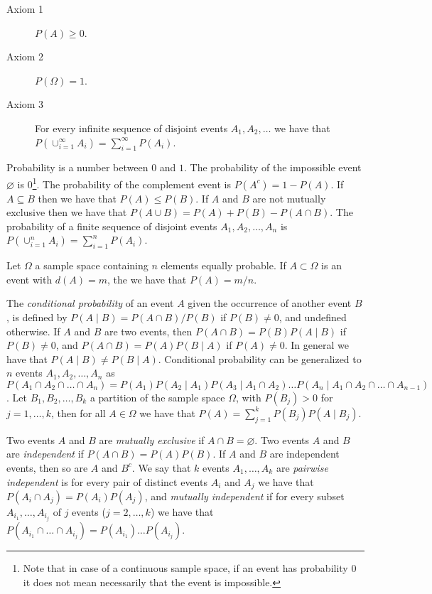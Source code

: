 \medskip

\begin{description}
\item [Axiom 1] $P(A) \geq 0$.
\item [Axiom 2] $P(\Omega) = 1$.
\item [Axiom 3] For every infinite sequence of disjoint events $A_1, A_2, \ldots$ we have that $P(\cup_{i=1}^\infty A_i) = \sum_{i=1}^\infty P(A_i)$.
\end{description}

\medskip

Probability is a number between $0$ and $1$. The probability of the impossible event $\varnothing$ is $0$\footnote{Note that in case of a continuous sample space, if an event has probability $0$ it does not mean necessarily that the event is impossible.}. The probability of the complement event is $P(A^c) = 1 - P(A)$. If $A \subseteq B$ then we have that $P(A) \leq P(B)$. If $A$ and $B$ are not mutually exclusive then we have that $P(A \cup B) = P(A) + P(B) - P(A \cap B)$. The probability of a finite sequence of disjoint events $A_1, A_2, \ldots, A_n$ is $P(\cup_{i=1}^n A_i) = \sum_{i=1}^n P(A_i)$.

\begin{example}
Let $\Omega$ a sample space containing $n$ elements equally probable. If $A \subset \Omega$ is an event with $d(A) = m$, the we have that $P(A) = m/n$.
\end{example}

The \emph{conditional probability} of an event $A$ given the occurrence of another event $B$, is defined by $P(A \mid B) = P(A \cap B) / P(B)$ if $P(B) \neq 0$, and undefined otherwise. If $A$ and $B$ are two events, then $P(A \cap B) = P(B) P(A \mid B)$ if $P(B) \neq 0$, and $P(A \cap B) = P(A) P(B \mid A)$ if $P(A) \neq 0$. In general we have that $P(A \mid B) \neq P(B \mid A)$. Conditional probability can be generalized to $n$ events $A_1, A_2, \ldots, A_n$ as $P(A_1 \cap A_2 \cap \ldots \cap A_n) = P(A_1) P(A_2 \mid A_1) P(A_3 \mid A_1 \cap A_2) \ldots P(A_n \mid A_1 \cap A_2 \cap \ldots \cap A_{n-1})$. Let $B_1, B_2, \ldots, B_k$ a partition of the sample space $\Omega$, with $P(B_j) > 0$ for $j = 1, \ldots, k$, then for all $A \in \Omega$ we have that $P(A) = \sum_{j=1}^k P(B_j)P(A \mid B_j)$.

Two events $A$ and $B$ are \emph{mutually exclusive} if $A \cap B = \varnothing$. Two events $A$ and $B$ are \emph{independent} if $P(A \cap B) = P(A)P(B)$. If $A$ and $B$ are independent events, then so are $A$ and $B^c$. We say that $k$ events $A_1, \ldots, A_k$ are \emph{pairwise independent} is for every pair of distinct events $A_i$ and $A_j$ we have that $P(A_i \cap A_j) = P(A_i) P(A_j)$, and \emph{mutually independent} if for every subset $A_{i_1}, \ldots, A_{i_j}$ of $j$ events ($j = 2, \ldots, k$) we have that $P(A_{i_1} \cap \ldots \cap A_{i_j}) = P(A_{i_1}) \ldots P(A_{i_j})$.

